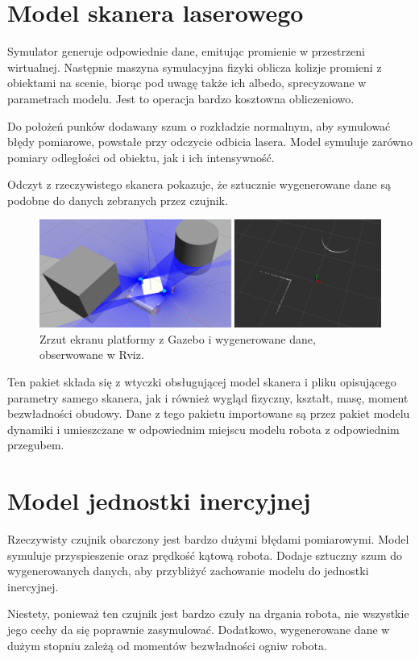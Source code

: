 \section{Model skanera laserowego}
	\label{sec:monokl}
	Symulator generuje odpowiednie dane, emitując promienie w przestrzeni wirtualnej.
	Następnie maszyna symulacyjna fizyki oblicza kolizje promieni z obiektami na scenie, biorąc pod uwagę także ich albedo, sprecyzowane w parametrach modelu. 
	Jest to operacja bardzo kosztowna obliczeniowo.
	
	Do położeń punków dodawany szum o rozkładzie normalnym, aby symulować błędy pomiarowe, powstałe przy odczycie odbicia lasera.
	Model symuluje zarówno pomiary odległości od obiektu, jak i ich intensywność.
	
	Odczyt z rzeczywistego skanera pokazuje, że sztucznie wygenerowane dane są podobne do danych zebranych przez czujnik.

	\begin{figure}[h]
	\centering
	\includegraphics[width=\textwidth]{graphics/scan.png}
	\caption{Zrzut ekranu platformy z Gazebo i wygenerowane dane, obserwowane w Rviz.}
	\label{fig:scan}
	\end{figure}
	
	Ten pakiet składa się z wtyczki obsługującej model skanera i pliku opisującego parametry samego skanera, jak i również wygląd fizyczny, kształt, masę, moment bezwładności obudowy.
	Dane z tego pakietu importowane są przez pakiet modelu dynamiki i umieszczane w odpowiednim miejscu modelu robota z odpowiednim przegubem.
	
\section{Model jednostki inercyjnej}
	Rzeczywisty czujnik obarczony jest bardzo dużymi błędami pomiarowymi.
	Model symuluje przyspieszenie oraz prędkość kątową robota.
	Dodaje sztuczny szum do wygenerowanych danych, aby przybliżyć zachowanie modelu do jednostki inercyjnej.
	
	Niestety, ponieważ ten czujnik jest bardzo czuły na drgania robota, nie wszystkie jego cechy da się poprawnie zasymulować.
	Dodatkowo, wygenerowane dane w dużym stopniu zależą od momentów bezwładności ogniw robota.
	
